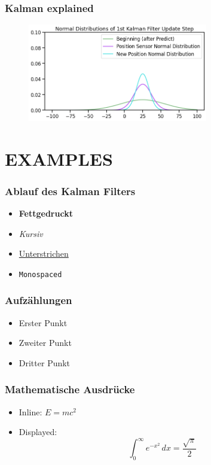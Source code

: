 \documentclass{beamer}
\begin{document}
\begin{frame}
    \frametitle{Kalman explained}
    \begin{figure}
        \centering
        \includegraphics[width=0.7\textwidth]{images/05_correction.png}
    \end{figure}
\end{frame}


\section{EXAMPLES}

\begin{frame}
    \frametitle{Ablauf des Kalman Filters}
    \begin{itemize}
        \item \textbf{Fettgedruckt}
        \item \textit{Kursiv}
        \item \underline{Unterstrichen}
        \item \texttt{Monospaced}
    \end{itemize}
\end{frame}

\begin{frame}
    \frametitle{Aufzählungen}
    \begin{itemize}
        \item Erster Punkt
        \item Zweiter Punkt
        \item Dritter Punkt
    \end{itemize}
\end{frame}

\begin{frame}
    \frametitle{Mathematische Ausdrücke}
    \begin{itemize}
        \item Inline: \(E = mc^2\)
        \item Displayed:
              \[
                  \int_0^\infty e^{-x^2} \, dx = \frac{\sqrt{\pi}}{2}
              \]
    \end{itemize}
\end{frame}
\end{document}
